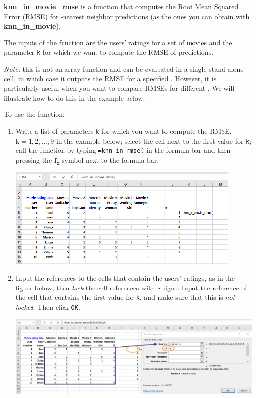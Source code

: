 \documentclass[12pt]{article}
\begin{document}
\textbf{knn\_in\_movie\_rmse} is a function that computes the Root Mean Squared Error (RMSE) for -nearest neighbor predictions (as the ones you can obtain with \textbf{knn\_in\_movie}).


The inputs of the function are the users' ratings for a set of movies and the parameter \texttt{k} for which we want to compute the RMSE of predictions.

\textit{Note:} this is not an array function and can be evaluated in a single stand-alone cell, in which case it outputs the RMSE for a specified . However, it is particularly useful when you want to compare RMSEs for different . We will illustrate how to do this in the example below.

To use the function:
\begin{enumerate}
\item Write a list of parameters \texttt{k} for which you want to compute the RMSE, $\texttt{k}=1,2,...,9$ in the example below; select the cell next to the first value for \texttt{k}; call the function by typing \texttt{=knn\_in\_rmse(} in the formula bar and then pressing the $\boldsymbol{f_x}$ symbol next to the formula bar.

\medskip

\centerline{\includegraphics[width=4.5in]{figures/knninmoviermse1}}

\medskip

\item Input the references to the cells that contain the users' ratings, as in the figure below, then \textit{lock} the cell references with $\$$ signs. Input the reference of the cell that contains the first value for \texttt{k}, and make sure that this is \textit{not locked}. Then click \texttt{OK}.

\medskip

\centerline{\includegraphics[width=5in]{figures/knninmoviermse2}}


\end{enumerate}
\end{document}

